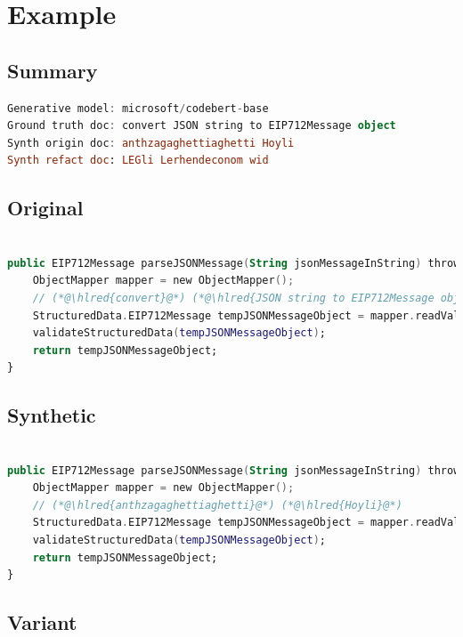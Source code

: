\documentclass[usenames,dvipsnames]{article} %
\DeclareRobustCommand{\hlred}[1]{{\sethlcolor{pink}\hl{#1}}}
\begin{document}

\pagebreak
\section{Example}
\subsection{Summary}

\begin{lstlisting}[language=kotlin]
Generative model: microsoft/codebert-base
Ground truth doc: convert JSON string to EIP712Message object
Synth origin doc: anthzagaghettiaghetti Hoyli
Synth refact doc: LEGli Lerhendeconom wid
\end{lstlisting}

\subsection{Original}
\begin{lstlisting}[language=kotlin]

public EIP712Message parseJSONMessage(String jsonMessageInString) throws IOException, RuntimeException {
    ObjectMapper mapper = new ObjectMapper();
    // (*@\hlred{convert}@*) (*@\hlred{JSON string to EIP712Message object}@*)
    StructuredData.EIP712Message tempJSONMessageObject = mapper.readValue(jsonMessageInString, EIP712Message.class);
    validateStructuredData(tempJSONMessageObject);
    return tempJSONMessageObject;
}
\end{lstlisting}
\subsection{Synthetic}

\begin{lstlisting}[language=kotlin]

public EIP712Message parseJSONMessage(String jsonMessageInString) throws IOException, RuntimeException {
    ObjectMapper mapper = new ObjectMapper();
    // (*@\hlred{anthzagaghettiaghetti}@*) (*@\hlred{Hoyli}@*)
    StructuredData.EIP712Message tempJSONMessageObject = mapper.readValue(jsonMessageInString, EIP712Message.class);
    validateStructuredData(tempJSONMessageObject);
    return tempJSONMessageObject;
}
\end{lstlisting}

\subsection{Variant}
\end{document}
